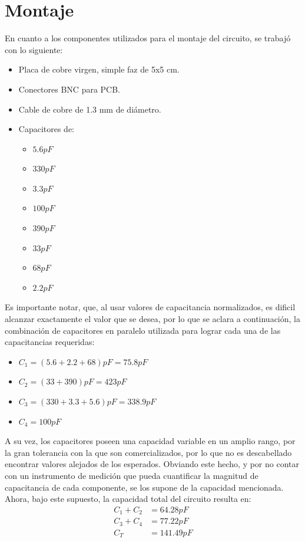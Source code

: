 \documentclass{article}
\begin{document}
\section{Montaje}
En cuanto a los componentes utilizados para el montaje del circuito, se trabajó con lo siguiente:
\begin{itemize}
    \item Placa de cobre virgen, simple faz de 5x5 cm.
    \item Conectores BNC para PCB.
    \item Cable de cobre de 1.3 mm de diámetro.
    \item Capacitores de:    
        \begin{itemize}
            \item $5.6 pF$
            \item $330 pF$
            \item $3.3 pF$
            \item $100 pF$
            \item $390 pF$
            \item $33 pF$
            \item $68 pF$
            \item $2.2 pF$            
        \end{itemize}
\end{itemize}
\noindent Es importante notar, que, al usar valores de capacitancia normalizados, es dificil alcanzar exactamente el valor que se desea, por lo que se aclara a continuación, la combinación de capacitores en paralelo utilizada para lograr cada una de las capacitancias requeridas:
\begin{itemize}
    \item $C_1=(5.6+2.2+68)  pF=75.8 pF$
	\item $C_2=(33+390)  pF=423 pF$
	\item $C_3=(330+3.3+5.6)  pF=338.9 pF$
	\item $C_4=100 pF$
\end{itemize}
\noindent A su vez, los capacitores poseen una capacidad variable en un amplio rango, por la gran tolerancia con la que son comercializados, por lo que no es descabellado encontrar valores alejados de los esperados. Obviando este hecho, y por no contar con un instrumento de medición que pueda cuantificar la magnitud de capacitancia de cada componente, se los supone de la capacidad mencionada. Ahora, bajo este supuesto, la capacidad total del circuito resulta en:
\begin{align*}
    C_1 + C_2 &= 64.28 pF \\
    C_3 + C_4 &= 77.22 pF \\
    C_T &= 141.49 pF
\end{align*}
\end{document}
